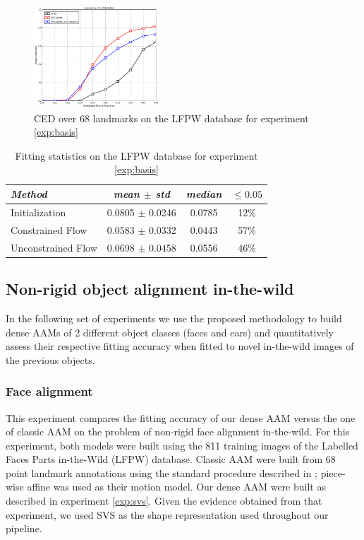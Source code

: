 \begin{figure}[t!]
\centering
\includegraphics[width=0.42\textwidth]{resources/basis_ced}
\caption{CED over 68 landmarks on the LFPW database for experiment \ref{exp:basis}}
\label{fig:basis_ced}
\end{figure}

\begin{table}[t]
\small
\centering
\begin{tabular}{|l|c|c|c|}
\hline
\emph{Method}       & \emph{mean $\pm$ std} & \emph{median} & $\leq 0.05$\\
\hline\hline
Initialization      & 0.0805 $\pm$ 0.0246 & 0.0785 & 12\%\\
Constrained Flow    & 0.0583 $\pm$ 0.0332 & 0.0443 & 57\%\\
Unconstrained Flow  & 0.0698 $\pm$ 0.0458 & 0.0556 & 46\%\\
\hline
\end{tabular}
\caption{Fitting statistics on the LFPW database for experiment \ref{exp:basis}}
\label{tab:basis_stats}
\end{table}



\subsection{Non-rigid object alignment in-the-wild}
\label{exp:alignment}

In the following set of experiments we use the proposed methodology to build dense AAMs of 2 different object classes (faces and ears) and quantitatively assess their respective fitting accuracy when fitted to novel in-the-wild images of the previous objects.

\subsubsection{Face alignment}
\label{exp:face}

This experiment compares the fitting accuracy of our dense AAM versus the one of classic AAM on the problem of non-rigid face alignment in-the-wild. For this experiment, both models were built using the 811 training images of the Labelled Faces Parts in-the-Wild (LFPW) \cite{Belhumeur2011} database. Classic AAM were built from 68 point landmark annotations using the standard procedure described in \cite{Cootes2001, Matthews2004}; piece-wise affine was used as their motion model. Our dense AAM were built as described in experiment \ref{exp:svs}. Given the evidence obtained from that experiment, we used SVS as the shape representation used throughout our pipeline.

